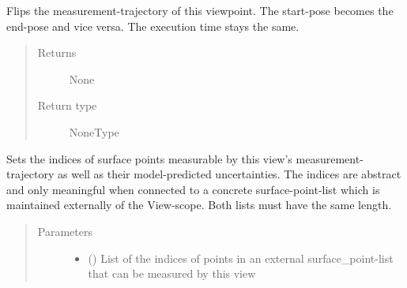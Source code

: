 \documentclass[letterpaper,10pt,english]{sphinxmanual}
\begin{document}
\begin{fulllineitems}
\begin{fulllineitems}
\begin{quote}
\begin{description}
\end{description}\end{quote}

\end{fulllineitems}


\begin{fulllineitems}
\label{\detokenize{module_view:agiprobot_measurement.viewpoint.ViewPoint.reverse_trajectory_for_measurement}}
Flips the measurement-trajectory of this viewpoint. The start-pose becomes the end-pose and vice versa. The execution time stays the same.
\begin{quote}\begin{description}
\item[{Returns}] \leavevmode
None

\item[{Return type}] \leavevmode
NoneType

\end{description}\end{quote}

\end{fulllineitems}


\begin{fulllineitems}
\label{\detokenize{module_view:agiprobot_measurement.viewpoint.ViewPoint.set_measurable_surface_point_indices_and_uncertainties}}
Sets the indices of surface points measurable by this view’s measurement-trajectory as well as their model-predicted uncertainties. 
The indices are abstract and only meaningful when connected to a concrete surface-point-list which is maintained externally of the View-scope.
Both lists must have the same length.
\begin{quote}\begin{description}
\item[{Parameters}] \leavevmode\begin{itemize}
\item {} 
 (\sphinxstyleliteralemphasis{{[}}\sphinxstyleliteralemphasis{{]}}) \textendash{} List of the indices of points in an external surface\_point-list that can be measured by this view


\end{itemize}
\end{description}
\end{quote}
\end{fulllineitems}
\end{fulllineitems}
\end{document}
